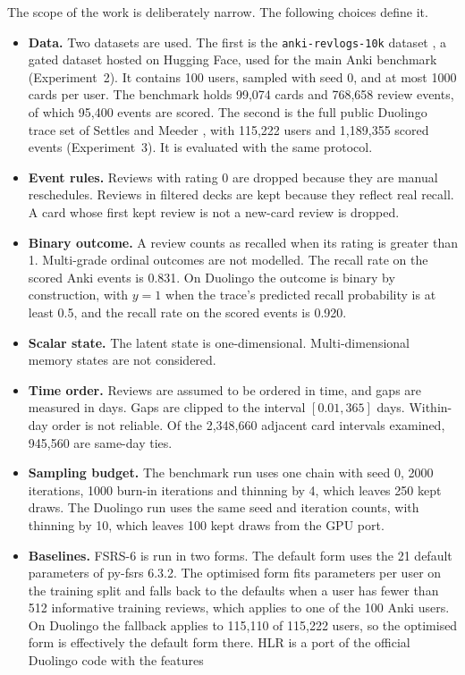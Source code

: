 The scope of the work is deliberately narrow. The following choices define it.

\begin{itemize}
  \item \textbf{Data.} Two datasets are used. The first is the \texttt{anki-revlogs-10k} dataset \cite{ankirevlogs10k}, a gated dataset hosted on Hugging Face, used for the main Anki benchmark (Experiment~2). It contains 100 users, sampled with seed 0, and at most 1000 cards per user. The benchmark holds 99,074 cards and 768,658 review events, of which 95,400 events are scored. The second is the full public Duolingo trace set of Settles and Meeder \cite{settles2016trainable}, with 115,222 users and 1,189,355 scored events (Experiment~3). It is evaluated with the same protocol.
  \item \textbf{Event rules.} Reviews with rating 0 are dropped because they are manual reschedules.
    Reviews in filtered decks are kept because they reflect real recall. A card whose first kept
    review is not a new-card review is dropped.
  \item \textbf{Binary outcome.} A review counts as recalled when its rating is greater than 1.
    Multi-grade ordinal outcomes are not modelled. The recall rate on the scored Anki events is 0.831. On Duolingo the outcome is binary by construction, with $y = 1$ when the trace's predicted recall probability is at least 0.5, and the recall rate on the scored events is 0.920.
  \item \textbf{Scalar state.} The latent state is one-dimensional. Multi-dimensional memory
    states are not considered.
  \item \textbf{Time order.} Reviews are assumed to be ordered in time, and gaps are measured in
    days. Gaps are clipped to the interval $[0.01, 365]$ days. Within-day order is not reliable.
    Of the 2,348,660 adjacent card intervals examined, 945,560 are same-day ties.
  \item \textbf{Sampling budget.} The benchmark run uses one chain with seed 0, 2000 iterations, 1000
    burn-in iterations and thinning by 4, which leaves 250 kept draws. The Duolingo run uses the same seed and iteration counts, with thinning by 10, which leaves 100 kept draws from the GPU port.
  \item \textbf{Baselines.} FSRS-6 is run in two forms. The default form uses the 21 default
    parameters of py-fsrs 6.3.2. The optimised form fits parameters per user on the training split
    and falls back to the defaults when a user has fewer than 512 informative training reviews, which applies to one of the 100 Anki users. On Duolingo the fallback applies to 115,110 of 115,222 users, so the optimised form is effectively the default form there. HLR is a port of the official Duolingo code with the features

\end{itemize}

